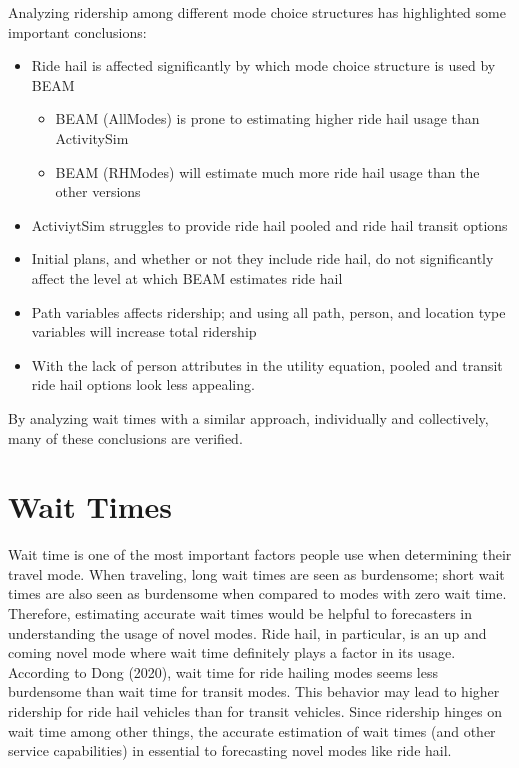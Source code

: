 \documentclass[12pt, oneside, openright]{byuthesis}
\begin{document}
Analyzing ridership among different mode choice structures has highlighted some important conclusions:

\begin{itemize}
\item
  Ride hail is affected significantly by which mode choice structure is used by BEAM

  \begin{itemize}
  \item
    BEAM (AllModes) is prone to estimating higher ride hail usage than ActivitySim
  \item
    BEAM (RHModes) will estimate much more ride hail usage than the other versions
  \end{itemize}
\item
  ActiviytSim struggles to provide ride hail pooled and ride hail transit options
\item
  Initial plans, and whether or not they include ride hail, do not significantly affect the level at which BEAM estimates ride hail
\item
  Path variables affects ridership; and using all path, person, and location type variables will increase total ridership
\item
  With the lack of person attributes in the utility equation, pooled and transit ride hail options look less appealing.
\end{itemize}

By analyzing wait times with a similar approach, individually and collectively, many of these conclusions are verified.

\hypertarget{res-waits}{%
\section{Wait Times}\label{res-waits}}

Wait time is one of the most important factors people use when determining their travel mode. When traveling, long wait times are seen as burdensome; short wait times are also seen as burdensome when compared to modes with zero wait time. Therefore, estimating accurate wait times would be helpful to forecasters in understanding the usage of novel modes. Ride hail, in particular, is an up and coming novel mode where wait time definitely plays a factor in its usage. According to Dong (2020), wait time for ride hailing modes seems less burdensome than wait time for transit modes. This behavior may lead to higher ridership for ride hail vehicles than for transit vehicles. Since ridership hinges on wait time among other things, the accurate estimation of wait times (and other service capabilities) in essential to forecasting novel modes like ride hail.
\end{document}
